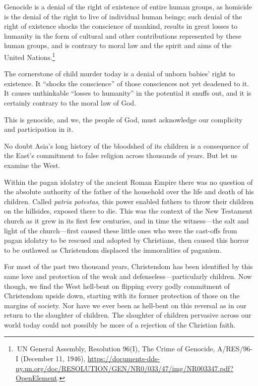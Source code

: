 \documentclass[
]{book}
\begin{document}
Genocide is a denial of the right of existence of entire human groups, as homicide is the denial of the right to live of individual human beings; such denial of the right of existence shocks the conscience of mankind, results in great losses to humanity in the form of cultural and other contributions represented by these human groups, and is contrary to moral law and the spirit and aims of the United Nations.\footnote{ UN General Assembly, Resolution 96(I), The Crime of Genocide, A/RES/96-I (December 11, 1946), \url{https://documents-dds-ny.un.org/doc/RESOLUTION/GEN/NR0/033/47/img/NR003347.pdf?OpenElement}.}

The cornerstone of child murder today is a denial of unborn babies' right to existence. It ``shocks the conscience'' of those consciences not yet deadened to it. It causes unthinkable ``losses to humanity'' in the potential it snuffs out, and it is certainly contrary to the moral law of God.

This is genocide, and we, the people of God, must acknowledge our complicity and participation in it.

No doubt Asia's long history of the bloodshed of its children is a consequence of the East's commitment to false religion across thousands of years. But let us examine the West.

Within the pagan idolatry of the ancient Roman Empire there was no question of the absolute authority of the father of the household over the life and death of his children. Called \emph{patria potestas}, this power enabled fathers to throw their children on the hillsides, exposed there to die. This was the context of the New Testament church as it grew in its first few centuries, and in time the witness---the salt and light of the church---first caused these little ones who were the cast-offs from pagan idolatry to be rescued and adopted by Christians, then caused this horror to be outlawed as Christendom displaced the immoralities of paganism.

For most of the past two thousand years, Christendom has been identified by this same love and protection of the weak and defenseless---particularly children. Now though, we find the West hell-bent on flipping every godly commitment of Christendom upside down, starting with its former protection of those on the margins of society. Nor have we ever been as hell-bent on this reversal as in our return to the slaughter of children. The slaughter of children pervasive across our world today could not possibly be more of a rejection of the Christian faith.
\end{document}

